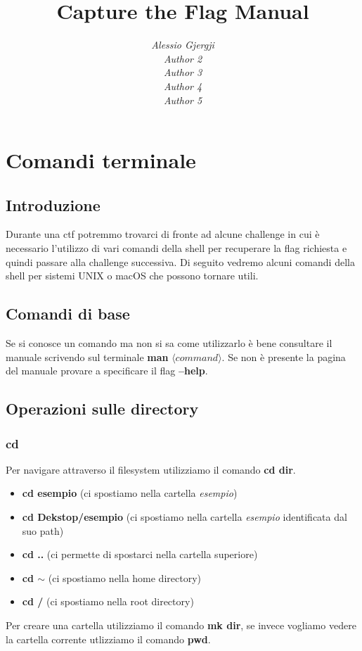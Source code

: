 \documentclass[oneside,a4paper,11pt]{book}
\title{Capture the Flag Manual}
\author{\textit{Alessio Gjergji}\\
\textit{Author 2} \\
\textit{Author 3} \\
\textit{Author 4} \\
\textit{Author 5}}
\date{}
\theoremstyle{italicstyle}
\theoremstyle{normStyle}
\begin{document}
\maketitle
\tableofcontents
\chapter{Comandi terminale}
\section{Introduzione}
Durante una ctf potremmo trovarci di fronte ad alcune challenge in cui è necessario l'utilizzo di vari comandi della shell per recuperare la flag richiesta e quindi passare alla challenge successiva.
Di seguito vedremo alcuni comandi della shell per sistemi UNIX o macOS che possono tornare utili.

\section{Comandi di base}
Se si conosce un comando ma non si sa come utilizzarlo è bene consultare il manuale scrivendo sul terminale \textbf{man} $\langle command \rangle$. Se non è presente la pagina del manuale provare a specificare il flag \textbf{--help}. 

\section{Operazioni sulle directory}
\subsection{cd}
Per navigare attraverso il filesystem utilizziamo il comando \textbf{cd dir}.
\begin{itemize}
    \item \textbf{cd esempio} (ci spostiamo nella cartella \textit{esempio})
    \item \textbf{cd Dekstop/esempio} (ci spostiamo nella cartella \textit{esempio} identificata dal suo path)
    \item \textbf{cd ..} (ci permette di spostarci nella cartella superiore)
    \item \textbf{cd $\sim$} (ci spostiamo nella home directory)
    \item \textbf{cd /} (ci spostiamo nella root directory)
\end{itemize}
Per creare una cartella utilizziamo il comando \textbf{mk dir}, se invece vogliamo vedere la cartella corrente utlizziamo il comando \textbf{pwd}.
\end{document}
